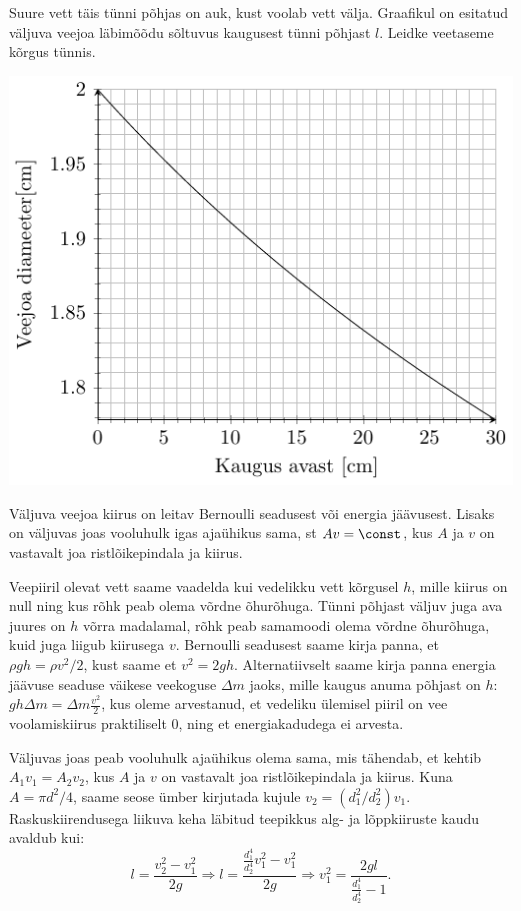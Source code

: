 
Suure vett täis tünni põhjas on auk, kust voolab vett välja. Graafikul on esitatud väljuva veejoa läbimõõdu sõltuvus kaugusest tünni põhjast $l$. Leidke veetaseme kõrgus tünnis.

\begin{center}
\includegraphics[width = 0.6\linewidth]{2018-v3g-02-juga.pdf}
\end{center}

\hint
Väljuva veejoa kiirus on leitav Bernoulli seadusest või energia jäävusest. Lisaks on väljuvas joas vooluhulk igas ajaühikus sama, st $Av = \const$, kus $A$ ja $v$ on vastavalt joa ristlõikepindala ja kiirus.

\solu
Veepiiril olevat vett saame vaadelda kui vedelikku vett kõrgusel $h$, mille kiirus on null ning kus rõhk peab olema võrdne õhurõhuga. Tünni põhjast väljuv juga ava juures on $h$ võrra madalamal, rõhk peab samamoodi olema võrdne õhurõhuga, kuid juga liigub kiirusega $v$. Bernoulli seadusest saame kirja panna, et $\rho g h = \rho v^2/2$, kust saame et $v^2=2gh$. Alternatiivselt saame kirja panna energia jäävuse seaduse väikese veekoguse $\Delta m$ jaoks, mille kaugus anuma põhjast on $h$: $ g h \Delta m = \Delta m \frac{v^2}{2}$, kus oleme arvestanud, et vedeliku ülemisel piiril on vee voolamiskiirus praktiliselt 0, ning et energiakadudega ei arvesta. 

Väljuvas joas peab vooluhulk ajaühikus olema sama, mis tähendab, et kehtib $A_1v_1=A_2v_2$, kus $A$ ja $v$ on vastavalt joa ristlõikepindala ja kiirus. Kuna $A=\pi d^2/4$, saame seose ümber kirjutada kujule $v_2=(d_1^2/d_2^2)v_1$. Raskuskiirendusega liikuva keha läbitud teepikkus alg- ja lõppkiiruste kaudu avaldub kui:
$$l=\frac{v_2^2-v_1^2}{2g} \Rightarrow l=\frac{\frac{d_1^4}{d_2^4}v_1^2-v_1^2}{2g} \Rightarrow v_1^2=\frac{2gl}{\frac{d_1^4}{d_2^4}-1}.$$

